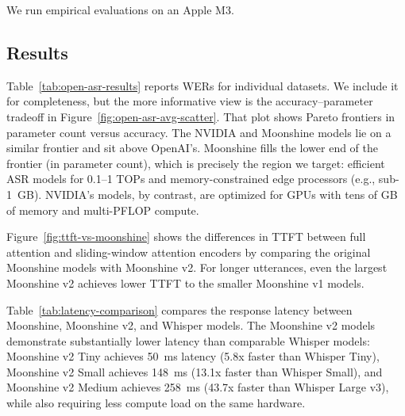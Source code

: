 We run empirical evaluations on an Apple M3.

\subsection{Results}
Table~\ref{tab:open-asr-results} reports WERs for individual datasets. We include it
for completeness, but the more informative view is the accuracy--parameter
tradeoff in Figure~\ref{fig:open-asr-avg-scatter}. That plot shows Pareto
frontiers in parameter count versus accuracy. The NVIDIA and Moonshine models
lie on a similar frontier and sit above OpenAI's. Moonshine fills the lower end
of the frontier (in parameter count), which is precisely the region we target:
efficient ASR models for 0.1--1 TOPs and memory-constrained edge processors
(e.g., sub-1~GB). NVIDIA's models, by contrast, are optimized for GPUs with tens
of GB of memory and multi-PFLOP compute.


Figure~\ref{fig:ttft-vs-moonshine} shows the differences in TTFT between full attention and sliding-window attention encoders by comparing the original Moonshine models with Moonshine v2. For longer utterances, even the largest Moonshine v2 achieves lower TTFT to the smaller Moonshine v1 models.



Table~\ref{tab:latency-comparison} compares the response latency between Moonshine, Moonshine v2, and Whisper models. The Moonshine v2 models demonstrate substantially lower latency than comparable Whisper models: Moonshine v2 Tiny achieves 50~ms latency (5.8x faster than Whisper Tiny), Moonshine v2 Small achieves 148~ms (13.1x faster than Whisper Small), and Moonshine v2 Medium achieves 258~ms (43.7x faster than Whisper Large v3), while also requiring less compute load on the same hardware.

